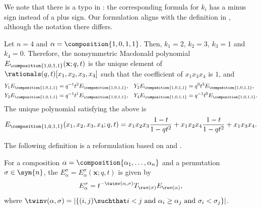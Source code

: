 \begin{remark}
	We note that there is a typo in \cite{Fer11}:
	the corresponding formula for \(k_i\) has a minus sign instead of a plus sign.
	Our formulation aligns with the definition in \cite{Kno97},
	although the notation there differs.
\end{remark}

\begin{example}
	\label{example:nonsymmetric-macdonald-polynomial}
	Let \(n = 4\) and \(\alpha = \composition{1, 0, 1, 1}\).
	Then, \(k_1 = 2\), \(k_2 = 3\), \(k_3 = 1\) and \(k_4 = 0\).
	Therefore, the nonsymmetric Macdonald polynomial
	\(E_{\composition{1, 0, 1, 1}}(\mathbf{x}; q, t)\)
	is the unique element of \(\rationals(q, t)[x_1, x_2, x_3, x_4]\) such that
	the coefficient of \(x_1 x_3 x_4\) is \(1\), and
	\begin{align*}
		Y_1 E_{\composition{1, 0, 1, 1}} & = q^{-1} t^{2} E_{\composition{1, 0, 1, 1}}, &
		Y_2 E_{\composition{1, 0, 1, 1}} & = q^{0}  t^{3} E_{\composition{1, 0, 1, 1}}, \\
		Y_3 E_{\composition{1, 0, 1, 1}} & = q^{-1} t^{1} E_{\composition{1, 0, 1, 1}}, &
		Y_4 E_{\composition{1, 0, 1, 1}} & = q^{-1} t^{0} E_{\composition{1, 0, 1, 1}}.
	\end{align*}
	The unique polynomial satisfying the above is
	\begin{equation*}
		E_{\composition{1, 0, 1, 1}}(x_1, x_2, x_3, x_4; q, t)
		=
		x_1 x_2 x_3 \frac{1 - t}{1 - q t^2} +
		x_1 x_2 x_4 \frac{1 - t}{1 - q t^2} +
		x_1 x_3 x_4.
	\end{equation*}
\end{example}

The following definition is a reformulation based on \cite[Corollary 16]{Ale19} and \cite[Remark 4.4.5]{Fer11}.

\begin{definition}
	\label{definition:permutedbasement}
	For a composition \(\alpha=\composition{\alpha_1,\ldots,\alpha_n}\)
	and a permutation \(\sigma \in \sym{n}\),
	the 
	\(E_\alpha^\sigma = E_{\alpha}^{\sigma}(\mathbf{x}; q, t)\)
	is given by
	\begin{equation*}
		E_{\alpha}^{\sigma} =
		t^{-\twinv(\alpha, \sigma)} T_{\rev(\sigma)} E_{\rev(\alpha)},
	\end{equation*}
	where
	\(
		\twinv(\alpha, \sigma) =
		\left| \{
			(i, j) \suchthat
			i < j \text{ and }
			\alpha_i \geq \alpha_j \text{ and }
			\sigma_i < \sigma_j
		\} \right|
	\).
\end{definition}


